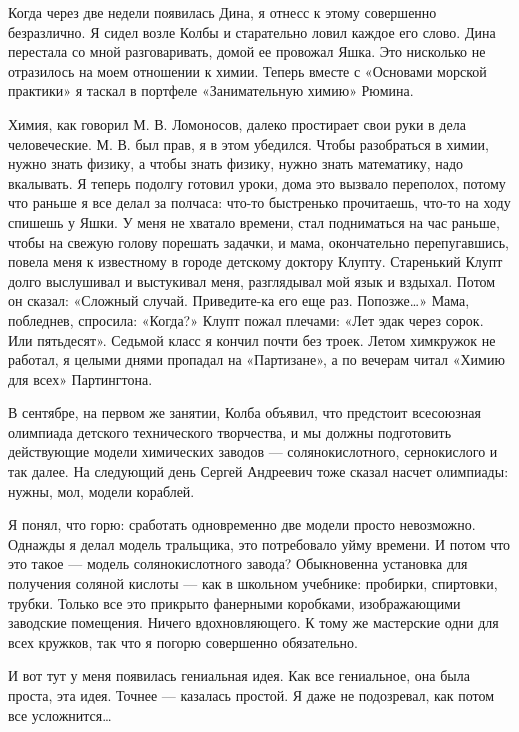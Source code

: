 Когда через  две  недели  появилась  Дина, я  отнесс  к  этому  совершенно
безразлично. Я сидел  возле Колбы  и старательно ловил  каждое его  слово.
Дина  перестала  со  мной  разговаривать,  домой  ее  провожал  Яшка.  Это
нисколько не  отразилось  на  моем  отношении к  химии.  Теперь  вместе  с
«Основами морской  практики» я  таскал  в портфеле  «Занимательную  химию»
Рюмина.

Химия, как говорил  М. В. Ломоносов,  далеко простирает свои  руки в  дела
человеческие. М.  В. был  прав, я  в этом  убедился. Чтобы  разобраться  в
химии, нужно знать физику, а  чтобы знать физику, нужно знать  математику,
надо  вкалывать.  Я  теперь  подолгу  готовил  уроки,  дома  это   вызвало
переполох, потому что  раньше я  все делал за  полчаса: что-то  быстренько
прочитаешь, что-то на ходу спишешь у Яшки. У меня не хватало времени, стал
подниматься на  час раньше,  чтобы на  свежую голову  порешать задачки,  и
мама, окончательно  перепугавшись,  повела  меня  к  известному  в  городе
детскому доктору Клупту.  Старенький Клупт долго  выслушивал и  выстукивал
меня, разглядывал мой язык  и вздыхал. Потом  он сказал: «Сложный  случай.
Приведите-ка его еще  раз. Попозже…» Мама,  побледнев, спросила:  «Когда?»
Клупт пожал плечами: «Лет эдак через сорок. Или пятьдесят». Седьмой  класс
я кончил  почти без  троек. Летом  химкружок не  работал, я  целыми  днями
пропадал на «Партизане», а по вечерам читал «Химию для всех» Партингтона.

В сентябре, на первом же занятии, Колба объявил, что предстоит  всесоюзная
олимпиада  детского  технического  творчества,  и  мы  должны  подготовить
действующие модели химических заводов  — солянокислотного, сернокислого  и
так  далее.  На  следующий  день  Сергей  Андреевич  тоже  сказал   насчет
олимпиады: нужны, мол, модели кораблей.

Я понял, что  горю: сработать одновременно  две модели просто  невозможно.
Однажды я делал модель  тральщика, это потребовало  уйму времени. И  потом
что это такое — модель солянокислотного завода? Обыкновенна установка  для
получения соляной кислоты — как в школьном учебнике: пробирки,  спиртовки,
трубки.  Только  все  это  прикрыто  фанерными  коробками,   изображающими
заводские помещения. Ничего вдохновляющего. К тому же мастерские одни  для
всех кружков, так что я погорю совершенно обязательно.

И вот тут у меня появилась  гениальная идея. Как все гениальное, она  была
проста, эта идея.  Точнее — казалась  простой. Я даже  не подозревал,  как
потом все усложнится…


